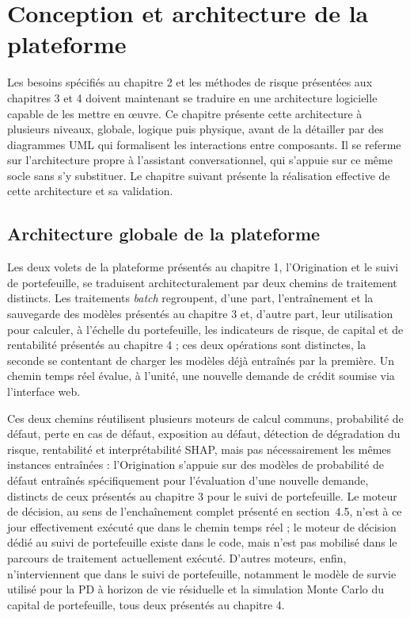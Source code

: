 \chapter{Conception et architecture de la plateforme}

Les besoins spécifiés au chapitre 2 et les méthodes de risque présentées aux chapitres 3 et 4 doivent maintenant se traduire en une architecture logicielle capable de les mettre en œuvre. Ce chapitre présente cette architecture à plusieurs niveaux, globale, logique puis physique, avant de la détailler par des diagrammes UML qui formalisent les interactions entre composants. Il se referme sur l'architecture propre à l'assistant conversationnel, qui s'appuie sur ce même socle sans s'y substituer. Le chapitre suivant présente la réalisation effective de cette architecture et sa validation.

\section{Architecture globale de la plateforme}

Les deux volets de la plateforme présentés au chapitre 1, l'Origination et le suivi de portefeuille, se traduisent architecturalement par deux chemins de traitement distincts. Les traitements \emph{batch} regroupent, d'une part, l'entraînement et la sauvegarde des modèles présentés au chapitre 3 et, d'autre part, leur utilisation pour calculer, à l'échelle du portefeuille, les indicateurs de risque, de capital et de rentabilité présentés au chapitre 4 ; ces deux opérations sont distinctes, la seconde se contentant de charger les modèles déjà entraînés par la première. Un chemin temps réel évalue, à l'unité, une nouvelle demande de crédit soumise via l'interface web.

Ces deux chemins réutilisent plusieurs moteurs de calcul communs, probabilité de défaut, perte en cas de défaut, exposition au défaut, détection de dégradation du risque, rentabilité et interprétabilité SHAP, mais pas nécessairement les mêmes instances entraînées : l'Origination s'appuie sur des modèles de probabilité de défaut entraînés spécifiquement pour l'évaluation d'une nouvelle demande, distincts de ceux présentés au chapitre 3 pour le suivi de portefeuille. Le moteur de décision, au sens de l'enchaînement complet présenté en section~4.5, n'est à ce jour effectivement exécuté que dans le chemin temps réel ; le moteur de décision dédié au suivi de portefeuille existe dans le code, mais n'est pas mobilisé dans le parcours de traitement actuellement exécuté. D'autres moteurs, enfin, n'interviennent que dans le suivi de portefeuille, notamment le modèle de survie utilisé pour la PD à horizon de vie résiduelle et la simulation Monte Carlo du capital de portefeuille, tous deux présentés au chapitre 4.

